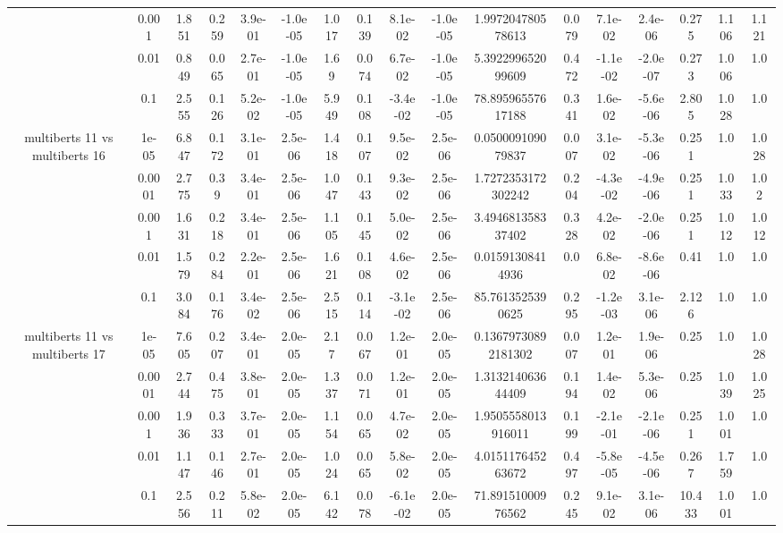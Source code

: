 \begin{tabular}{|c|c|c|c|c|c|c|c|c|c|c|c|c|c|c|c|c|}
 & 0.001 & 1.851 & 0.259 & 3.9e-01 & -1.0e-05 & 1.017 & 0.139 & 8.1e-02 & -1.0e-05 & 1.997204780578613 & 0.079 & 7.1e-02 & 2.4e-06 & 0.275 & 1.106 & 1.121 \\
 & 0.01 & 0.849 & 0.065 & 2.7e-01 & -1.0e-05 & 1.69 & 0.074 & 6.7e-02 & -1.0e-05 & 5.392299652099609 & 0.472 & -1.1e-02 & -2.0e-07 & 0.273 & 1.006 & 1.0 \\
 & 0.1 & 2.555 & 0.126 & 5.2e-02 & -1.0e-05 & 5.949 & 0.108 & -3.4e-02 & -1.0e-05 & 78.89596557617188 & 0.341 & 1.6e-02 & -5.6e-06 & 2.805 & 1.028 & 1.0 \\
\hline
\multirow{5}{*}{multiberts 11 vs multiberts 16} & 1e-05 & 6.847 & 0.172 & 3.1e-01 & 2.5e-06 & 1.418 & 0.107 & 9.5e-02 & 2.5e-06 & 0.050009109079837 & 0.007 & 3.1e-02 & -5.3e-06 & 0.251 & 1.0 & 1.028 \\
 & 0.0001 & 2.775 & 0.39 & 3.4e-01 & 2.5e-06 & 1.047 & 0.143 & 9.3e-02 & 2.5e-06 & 1.7272353172302242 & 0.204 & -4.3e-02 & -4.9e-06 & 0.251 & 1.033 & 1.02 \\
 & 0.001 & 1.631 & 0.218 & 3.4e-01 & 2.5e-06 & 1.105 & 0.145 & 5.0e-02 & 2.5e-06 & 3.494681358337402 & 0.328 & 4.2e-02 & -2.0e-06 & 0.251 & 1.012 & 1.012 \\
 & 0.01 & 1.579 & 0.284 & 2.2e-01 & 2.5e-06 & 1.621 & 0.108 & 4.6e-02 & 2.5e-06 & 0.01591308414936 & 0.0 & 6.8e-02 & -8.6e-06 & 0.41 & 1.0 & 1.0 \\
 & 0.1 & 3.084 & 0.176 & 3.4e-02 & 2.5e-06 & 2.515 & 0.114 & -3.1e-02 & 2.5e-06 & 85.7613525390625 & 0.295 & -1.2e-03 & 3.1e-06 & 2.126 & 1.0 & 1.0 \\
\hline
\multirow{5}{*}{multiberts 11 vs multiberts 17} & 1e-05 & 7.605 & 0.207 & 3.4e-01 & 2.0e-05 & 2.17 & 0.067 & 1.2e-01 & 2.0e-05 & 0.13679730892181302 & 0.007 & 1.2e-01 & 1.9e-06 & 0.25 & 1.0 & 1.028 \\
 & 0.0001 & 2.744 & 0.475 & 3.8e-01 & 2.0e-05 & 1.337 & 0.071 & 1.2e-01 & 2.0e-05 & 1.313214063644409 & 0.194 & 1.4e-02 & 5.3e-06 & 0.25 & 1.039 & 1.025 \\
 & 0.001 & 1.936 & 0.333 & 3.7e-01 & 2.0e-05 & 1.154 & 0.065 & 4.7e-02 & 2.0e-05 & 1.9505558013916011 & 0.199 & -2.1e-01 & -2.1e-06 & 0.251 & 1.001 & 1.0 \\
 & 0.01 & 1.147 & 0.146 & 2.7e-01 & 2.0e-05 & 1.024 & 0.065 & 5.8e-02 & 2.0e-05 & 4.015117645263672 & 0.497 & -5.8e-05 & -4.5e-06 & 0.267 & 1.759 & 1.0 \\
 & 0.1 & 2.556 & 0.211 & 5.8e-02 & 2.0e-05 & 6.142 & 0.078 & -6.1e-02 & 2.0e-05 & 71.89151000976562 & 0.245 & 9.1e-02 & 3.1e-06 & 10.433 & 1.001 & 1.0 \\

\end{tabular}

